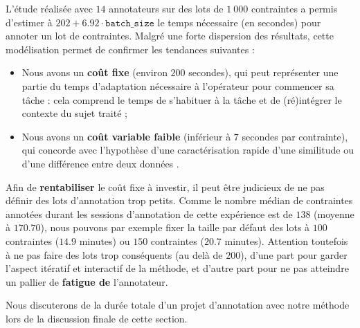 			L'étude réalisée avec $14$ annotateurs sur des lots de $1~000$ contraintes a permis d'estimer à $202 + 6.92 \cdot \texttt{batch\_size}$ le temps nécessaire (en secondes) pour annoter un lot de contraintes.
			Malgré une forte dispersion des résultats, cette modélisation permet de confirmer les tendances suivantes :
			\begin{itemize}
				\item Nous avons un \textbf{coût fixe} (environ $200$ secondes), qui peut représenter une partie du temps d'adaptation nécessaire à l'opérateur pour commencer sa tâche  : cela comprend le temps de s'habituer à la tâche et de (ré)intégrer le contexte du sujet traité ;
				\item Nous avons un \textbf{coût variable faible} (inférieur à $7$ secondes par contrainte), qui concorde avec l'hypothèse d'une caractérisation rapide d'une similitude ou d'une différence entre deux données .
			\end{itemize}
			Afin de \textbf{rentabiliser} le coût fixe à investir, il peut être judicieux de ne pas définir des lots d’annotation trop petits. 
			Comme le nombre médian de contraintes annotées durant les sessions d'annotation de cette expérience est de $138$ (moyenne à $170.70$), nous pouvons par exemple fixer la taille par défaut des lots à $100$ contraintes ($14.9$ minutes) ou $150$ contraintes ($20.7$ minutes).
			Attention toutefois à ne pas faire des lots trop conséquents (au delà de $200$), d'une part pour garder l'aspect itératif et interactif de la méthode, et d'autre part pour ne pas atteindre un pallier de \textbf{fatigue de} l'annotateur.
			
			Nous discuterons de la durée totale d'un projet d'annotation avec notre méthode lors de la discussion finale de cette section.
		
